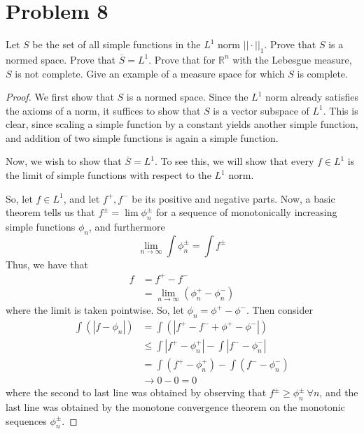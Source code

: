 \documentclass[fontsize=11pt]{scrartcl} %
\numberwithin{equation}{section} %
\numberwithin{figure}{section} %
\numberwithin{table}{section} %
\newcommand{\R}{\mathbb{R}}
\begin{document}
\section*{Problem 8}
Let $S$ be the set of all simple functions in the $L^1$ norm $||\cdot||_1$.
Prove that $S$ is a normed space. Prove that $\overline{S}=L^1$. Prove that for
$\R^n$ with the Lebesgue measure, $S$ is not complete. Give an example of a
measure space for which $S$ is complete.
\\
\begin{proof}
We first show that $S$ is a normed space. Since the $L^1$ norm already satisfies
    the axioms of a norm, it suffices to show that $S$ is a vector subspace of
    $L^1$. This is clear, since scaling a simple function by a constant yields
    another simple function, and addition of two simple functions is again a
    simple function.

    Now, we wish to show that $\overline{S}=L^1$. To see this, we will show that
    every $f\in L^1$ is the limit of simple functions with respect to the $L^1$
    norm.

    So, let $f\in L^1$, and let $f^+, f^-$ be its positive and negative parts.
    Now, a basic theorem tells us that $f^{\pm} = \lim \phi^{\pm}_n$ for a sequence of
    monotonically increasing simple functions $\phi_n$, and furthermore
    \[
        \lim_{n\to\infty}\int\phi^{\pm}_n = \int f^{\pm}
    \]
    Thus, we have that
    \[
        \begin{aligned}
            f &= f^+ - f^-\\
                &=\lim_{n\to\infty}(\phi^+_n - \phi^-_n)
        \end{aligned}
    \]
    where the limit is taken pointwise. So, let $\phi_n = \phi^+-\phi^-$. Then
    consider
    \[
        \begin{aligned}
            \int(|f-\phi_n|) &= \int(|f^+-f^-+\phi^+-\phi^-|)\\
                            &\leq \int |f^+ - \phi^+_n| -\int |f^- - \phi^-_n|\\
                            &= \int (f^+-\phi^+_n) - \int (f^- - \phi^-_n)\\
                            &\to 0-0 = 0
        \end{aligned}
    \]
    where the second to last line was obtained by observing that $f^{\pm}\geq
    \phi^{\pm}_n\ \forall n$, and the last line was obtained by the monotone
    convergence theorem on the monotonic sequences $\phi^{\pm}_n$.
    

\end{proof}
\end{document}
